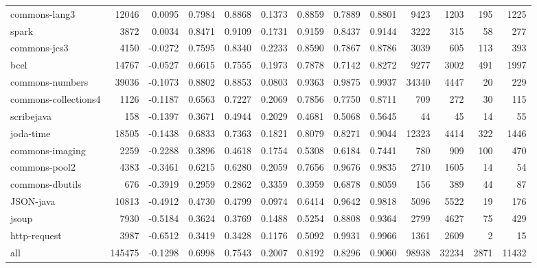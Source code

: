 \begin{table*}
\begin{tabular}{lrrrrrrrrrrrr}
          commons-lang3 &   12046 &      0.0095 &  0.7984 &     0.8868 &     0.1373 &  0.8859 &     0.7889 &   0.8801 &   9423 &   1203 &   195 &   1225 \\
                  spark &    3872 &      0.0034 &  0.8471 &     0.9109 &     0.1731 &  0.9159 &     0.8437 &   0.9144 &   3222 &    315 &    58 &    277 \\
           commons-jcs3 &    4150 &     -0.0272 &  0.7595 &     0.8340 &     0.2233 &  0.8590 &     0.7867 &   0.8786 &   3039 &    605 &   113 &    393 \\
                   bcel &   14767 &     -0.0527 &  0.6615 &     0.7555 &     0.1973 &  0.7878 &     0.7142 &   0.8272 &   9277 &   3002 &   491 &   1997 \\
        commons-numbers &   39036 &     -0.1073 &  0.8802 &     0.8853 &     0.0803 &  0.9363 &     0.9875 &   0.9937 &  34340 &   4447 &    20 &    229 \\
   commons-collections4 &    1126 &     -0.1187 &  0.6563 &     0.7227 &     0.2069 &  0.7856 &     0.7750 &   0.8711 &    709 &    272 &    30 &    115 \\
             scribejava &     158 &     -0.1397 &  0.3671 &     0.4944 &     0.2029 &  0.4681 &     0.5068 &   0.5645 &     44 &     45 &    14 &     55 \\
              joda-time &   18505 &     -0.1438 &  0.6833 &     0.7363 &     0.1821 &  0.8079 &     0.8271 &   0.9044 &  12323 &   4414 &   322 &   1446 \\
        commons-imaging &    2259 &     -0.2288 &  0.3896 &     0.4618 &     0.1754 &  0.5308 &     0.6184 &   0.7441 &    780 &    909 &   100 &    470 \\
          commons-pool2 &    4383 &     -0.3461 &  0.6215 &     0.6280 &     0.2059 &  0.7656 &     0.9676 &   0.9835 &   2710 &   1605 &    14 &     54 \\
        commons-dbutils &     676 &     -0.3919 &  0.2959 &     0.2862 &     0.3359 &  0.3959 &     0.6878 &   0.8059 &    156 &    389 &    44 &     87 \\
              JSON-java &   10813 &     -0.4912 &  0.4730 &     0.4799 &     0.0974 &  0.6414 &     0.9642 &   0.9818 &   5096 &   5522 &    19 &    176 \\
                  jsoup &    7930 &     -0.5184 &  0.3624 &     0.3769 &     0.1488 &  0.5254 &     0.8808 &   0.9364 &   2799 &   4627 &    75 &    429 \\
           http-request &    3987 &     -0.6512 &  0.3419 &     0.3428 &     0.1176 &  0.5092 &     0.9931 &   0.9966 &   1361 &   2609 &     2 &     15 \\
                    all &  145475 &     -0.1298 &  0.6998 &     0.7543 &     0.2007 &  0.8192 &     0.8296 &   0.9060 &  98938 &  32234 &  2871 &  11432 \\
\bottomrule
\end{tabular}
\end{table*}
